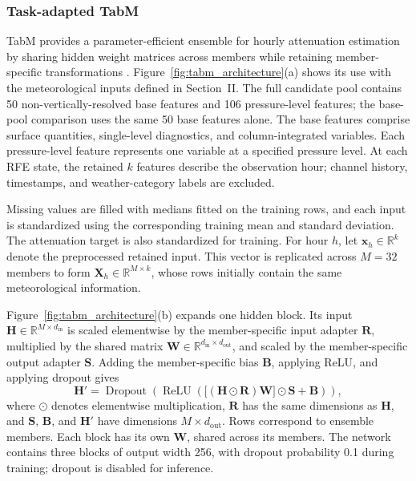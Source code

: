 \subsubsection{Task-adapted TabM}

TabM provides a parameter-efficient ensemble for hourly attenuation estimation by sharing hidden weight matrices across members while retaining member-specific transformations \cite{Gorishniy2025TabM}. Figure~\ref{fig:tabm_architecture}(a) shows its use with the meteorological inputs defined in Section~II. The full candidate pool contains 50 non-vertically-resolved base features and 106 pressure-level features; the base-pool comparison uses the same 50 base features alone. The base features comprise surface quantities, single-level diagnostics, and column-integrated variables. Each pressure-level feature represents one variable at a specified pressure level. At each RFE state, the retained $k$ features describe the observation hour; channel history, timestamps, and weather-category labels are excluded.

Missing values are filled with medians fitted on the training rows, and each input is standardized using the corresponding training mean and standard deviation. The attenuation target is also standardized for training. For hour $h$, let $\mathbf{x}_h\in\mathbb{R}^{k}$ denote the preprocessed retained input. This vector is replicated across $M=32$ members to form $\mathbf{X}_h\in\mathbb{R}^{M\times k}$, whose rows initially contain the same meteorological information.

Figure~\ref{fig:tabm_architecture}(b) expands one hidden block. Its input $\mathbf{H}\in\mathbb{R}^{M\times d_{\mathrm{in}}}$ is scaled elementwise by the member-specific input adapter $\mathbf{R}$, multiplied by the shared matrix $\mathbf{W}\in\mathbb{R}^{d_{\mathrm{in}}\times d_{\mathrm{out}}}$, and scaled by the member-specific output adapter $\mathbf{S}$. Adding the member-specific bias $\mathbf{B}$, applying ReLU, and applying dropout gives
\begin{equation}
\mathbf{H}'=
\operatorname{Dropout}\!\left(
\operatorname{ReLU}\!\left(
\bigl[(\mathbf{H}\odot\mathbf{R})\mathbf{W}\bigr]\odot\mathbf{S}
+\mathbf{B}
\right)\right),
\label{eq:tabm_hidden_block}
\end{equation}
where $\odot$ denotes elementwise multiplication, $\mathbf{R}$ has the same dimensions as $\mathbf{H}$, and $\mathbf{S}$, $\mathbf{B}$, and $\mathbf{H}'$ have dimensions $M\times d_{\mathrm{out}}$. Rows correspond to ensemble members. Each block has its own $\mathbf{W}$, shared across its members. The network contains three blocks of output width 256, with dropout probability 0.1 during training; dropout is disabled for inference.

